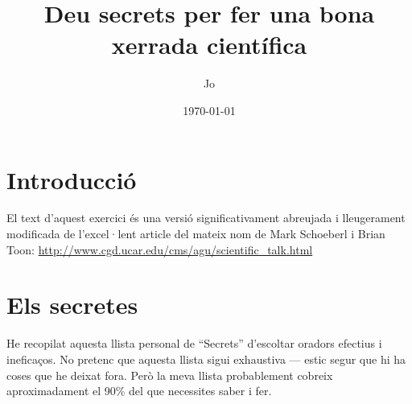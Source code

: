 \documentclass[12pt]{article}
\title{Deu secrets per fer una bona xerrada científica}
\author{Jo}
\date{\today}
\begin{document}
\maketitle

\section{Introducció}

El text d'aquest exercici és una versió significativament abreujada i lleugerament modificada de l'excel·lent article del mateix nom de Mark Schoeberl i Brian Toon:
\url{http://www.cgd.ucar.edu/cms/agu/scientific_talk.html}

\section{Els secretes}

He recopilat aquesta llista personal de ``Secrets'' d'escoltar oradors efectius i ineficaços. No pretenc que aquesta llista sigui exhaustiva --- estic segur que hi ha coses que he deixat fora. Però la meva llista probablement cobreix aproximadament el 90\% del que necessites saber i fer.
\end{document}
